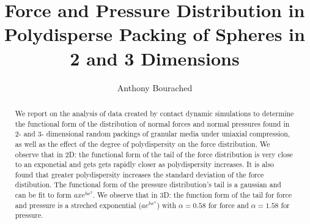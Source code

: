 \documentclass[12pt] {article} %
\begin{document}
\tableofcontents
\listoffigures

\title {Force and Pressure Distribution in Polydisperse Packing of Spheres in 2 and 3 Dimensions}

\author{Anthony Bourached}

\maketitle

\begin{abstract}
We report on the analysis of data created by contact dynamic simulations to determine the functional form of the distribution of normal forces and normal pressures found in 2- and 3- dimensional random packings of granular media under uniaxial compression, as well as the effect of the degree of polydispersity on the force distribution. We observe that in 2D: the functional form of the tail of the force distribution is very close to an exponetial and gets gets rapidly closer as polydispersity increases. It is also found that greater polydispersity increases the standard deviation of the force distibution. The functional form of the pressure distribution's tail is a gaussian and can be fit to form $axe^{bx^2}$. We observe that in 3D: the function form of the tail for force and pressure is a streched exponential ($ae^{bx^{\alpha}}$) with $\alpha = 0.58$ for force and $\alpha = 1.58$ for pressure.

\end{abstract}
\end{document}
